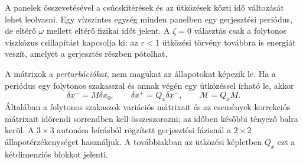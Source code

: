 A panelek összevetésével a csúcskitérések és az ütközések közti idő változását lehet leolvasni. Egy vízszintes egység minden panelben egy gerjesztési periódus, de eltérő $\omega$ mellett eltérő fizikai időt jelent. A $\zeta=0$ választás csak a folytonos viszkózus csillapítást kapcsolja ki: az $r<1$ ütközési törvény továbbra is energiát veszít, amelyet a gerjesztés részben pótolhat.

A mátrixok a \emph{perturbációkat}, nem magukat az állapotokat képezik le. Ha a periódus egy folytonos szakasszal és annak végén egy ütközéssel írható le, akkor
\[
\delta x^- = M\delta x_0,\qquad
\delta x^+ = Q_x\delta x^-,\qquad
\mathcal M=Q_xM.
\]
Általában a folytonos szakaszok variációs mátrixait és az események korrekciós mátrixait időrendi sorrendben kell összeszorozni; az időben későbbi tényező balra kerül. A $3\times3$ autonóm leírásból rögzített gerjesztési fázisnál a $2\times2$ állapotérzékenységet használjuk. A továbbiakban az ütközési képletben $Q_x$ ezt a kétdimenziós blokkot jelenti.
\exampleend

